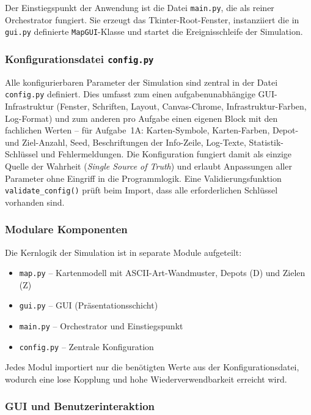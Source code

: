 Der Einstiegspunkt der Anwendung ist die Datei \texttt{main.py}, die als reiner Orchestrator fungiert. Sie erzeugt das Tkinter-Root-Fenster, instanziiert die in \texttt{gui.py} definierte \texttt{MapGUI}-Klasse und startet die Ereignisschleife der Simulation.

\subsubsection{Konfigurationsdatei \texttt{config.py}}

Alle konfigurierbaren Parameter der Simulation sind zentral in der Datei \texttt{config.py} definiert. Dies umfasst zum einen aufgabenunabhängige \acs{GUI}-Infrastruktur (Fenster, Schriften, Layout, Canvas-Chrome, Infrastruktur-Farben, Log-Format) und zum anderen pro Aufgabe einen eigenen Block mit den fachlichen Werten – für Aufgabe~1A: Karten-Symbole, Karten-Farben, Depot- und Ziel-Anzahl, Seed, Beschriftungen der Info-Zeile, Log-Texte, Statistik-Schlüssel und Fehlermeldungen. Die Konfiguration fungiert damit als einzige Quelle der Wahrheit (\textit{Single Source of Truth}) und erlaubt Anpassungen aller Parameter ohne Eingriff in die Programmlogik. Eine Validierungsfunktion \texttt{validate\_config()} prüft beim Import, dass alle erforderlichen Schlüssel vorhanden sind.

\subsubsection{Modulare Komponenten}

Die Kernlogik der Simulation ist in separate Module aufgeteilt:

\begin{itemize}
    \item \texttt{map.py} – Kartenmodell mit \acs{ASCII}-Art-Wandmuster, Depots (\acs{D}) und Zielen (\acs{Z})
    \item \texttt{gui.py} – \acs{GUI} (Präsentationsschicht)
    \item \texttt{main.py} – Orchestrator und Einstiegspunkt
    \item \texttt{config.py} – Zentrale Konfiguration
\end{itemize}

Jedes Modul importiert nur die benötigten Werte aus der Konfigurationsdatei, wodurch eine lose Kopplung und hohe Wiederverwendbarkeit erreicht wird.

\subsubsection{\acs{GUI} und Benutzerinteraktion}

